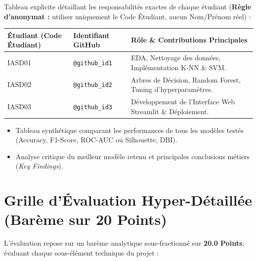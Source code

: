 \documentclass[11pt,a4paper]{article}
\begin{document}
\begin{tcolorbox}[colback=lightgray, colframe=sintefblue, title=\textbf{SECTION 3 : Rôles des Membres et Matrice des Contributions}, arc=2mm]
    Tableau explicite détaillant les responsabilités exactes de chaque étudiant (\textbf{Règle d'anonymat :} utiliser uniquement le Code Étudiant, aucun Nom/Prénom réel) :
    \begin{center}
    \small
    \begin{tabular}{|l|l|p{6cm}|}
    \hline
    \rowcolor{sintefblue}
    \color{white}\textbf{Étudiant (Code Étudiant)} & \color{white}\textbf{Identifiant GitHub} & \color{white}\textbf{Rôle \& Contributions Principales} \\ \hline
    IASD01 & \texttt{@github\_id1} & EDA, Nettoyage des données, Implémentation K-NN \& SVM. \\ \hline
    IASD02 & \texttt{@github\_id2} & Arbres de Décision, Random Forest, Tuning d'hyperparamètres. \\ \hline
    IASD03 & \texttt{@github\_id3} & Développement de l'Interface Web Streamlit \& Déploiement. \\ \hline
    \end{tabular}
    \end{center}
\end{tcolorbox}

\begin{tcolorbox}[colback=lightgray, colframe=sintefblue, title=\textbf{SECTION 4 : Résultats Clés et Synthèse des Découvertes}, arc=2mm]
    \begin{itemize}
        \item Tableau synthétique comparant les performances de tous les modèles testés (Accuracy, F1-Score, ROC-AUC ou Silhouette, DBI).
        \item Analyse critique du meilleur modèle retenu et principales conclusions métiers (\textit{Key Findings}).
    \end{itemize}
\end{tcolorbox}

\section{Grille d'Évaluation Hyper-Détaillée (Barème sur 20 Points)}

L'évaluation repose sur un barème analytique sous-fractionné sur \textbf{20.0 Points}, évaluant chaque sous-élément technique du projet :
\end{document}
